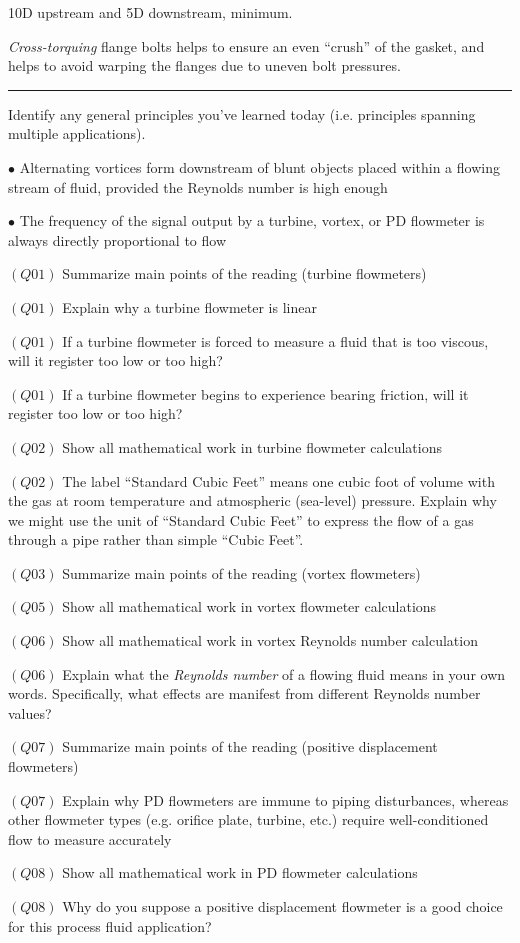 \vskip 10pt

10D upstream and 5D downstream, minimum.

\vskip 10pt

{\it Cross-torquing} flange bolts helps to ensure an even ``crush'' of the gasket, and helps to avoid warping the flanges due to uneven bolt pressures.


\filbreak \vskip 5pt \hrule \vskip 5pt  \vskip 10pt

\noindent
Identify any general principles you've learned today (i.e. principles spanning multiple applications).
\item{$\bullet$} Alternating vortices form downstream of blunt objects placed within a flowing stream of fluid, provided the Reynolds number is high enough
\item{$\bullet$} The frequency of the signal output by a turbine, vortex, or PD flowmeter is always directly proportional to flow
\medskip

\medskip
\item{$(Q01)$} Summarize main points of the reading (turbine flowmeters)
\item{$(Q01)$} Explain why a turbine flowmeter is linear
\item{$(Q01)$} If a turbine flowmeter is forced to measure a fluid that is too viscous, will it register too low or too high?
\item{$(Q01)$} If a turbine flowmeter begins to experience bearing friction, will it register too low or too high?
\item{$(Q02)$} Show all mathematical work in turbine flowmeter calculations
\item{$(Q02)$} The label ``Standard Cubic Feet'' means one cubic foot of volume with the gas at room temperature and atmospheric (sea-level) pressure.  Explain why we might use the unit of ``Standard Cubic Feet'' to express the flow of a gas through a pipe rather than simple ``Cubic Feet''.
\item{$(Q03)$} Summarize main points of the reading (vortex flowmeters)
\item{$(Q05)$} Show all mathematical work in vortex flowmeter calculations
\item{$(Q06)$} Show all mathematical work in vortex Reynolds number calculation
\item{$(Q06)$} Explain what the {\it Reynolds number} of a flowing fluid means in your own words.  Specifically, what effects are manifest from different Reynolds number values?
\item{$(Q07)$} Summarize main points of the reading (positive displacement flowmeters)
\item{$(Q07)$} Explain why PD flowmeters are immune to piping disturbances, whereas other flowmeter types (e.g. orifice plate, turbine, etc.) require well-conditioned flow to measure accurately
\item{$(Q08)$} Show all mathematical work in PD flowmeter calculations
\item{$(Q08)$} Why do you suppose a positive displacement flowmeter is a good choice for this process fluid application?
\medskip

